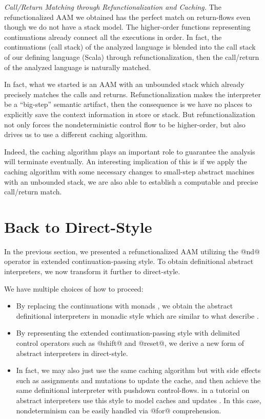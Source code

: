 \documentclass[acmsmall, review]{acmart}\settopmatter{}
\begin{document}
\textit{Call/Return Matching through Refunctionalization and Caching.}
The refunctionalized AAM we obtained has the perfect match on return-flows even though
we do not have a stack model. The higher-order functions representing continuations
already connect all the executions in order. In fact, the continuations (call stack)
of the analyzed language is blended into the call stack of our defining language
(Scala) through refunctionalization, then the call/return of the analyzed language
is naturally matched.

In fact, what we started is an AAM with an unbounded stack which already precisely
matches the calls and returns. Refunctionalization makes the interpreter be a ``big-step''
semantic artifact, then the consequence is we have no places to explicitly save the context
information in store or stack. 
But refunctionalization not only forces the nondeterministic control flow to be higher-order,
but also drives us to use a different caching algorithm.

Indeed, the caching algorithm plays an important role to guarantee the analysis will
terminate eventually.
An interesting implication of this is if we apply the caching algorithm with some 
necessary changes to small-step abstract machines with an unbounded stack, we are 
also able to establish a computable and precise call/return match.

\section{Back to Direct-Style} \label{directstyle}

In the previous section, we presented a refunctionalized AAM utilizing the @nd@ operator
in extended continuation-passing style.
To obtain definitional abstract interpreters, we now transform it further to direct-style.

We have multiple choices of how to proceed:
\begin{itemize}
  \item By replacing the continuations with monads \cite{filinski1994representing}, 
    we obtain the abstract definitional interpreters in monadic style which are similar to what 
    \citeauthor{darais2017abstracting} describe \cite{darais2017abstracting}.
  \item By representing the extended continuation-passing style with delimited control operators
    such as @shift@ and @reset@, we derive a new form of abstract interpreters in direct-style.
  \item In fact, we may also just use the same caching algorithm but with side effects such as
    assignments and mutations to update the cache, and then achieve the same definitional 
    interpreter with pushdown control-flows. \citeauthor{friedman-ai} in a tutorial on abstract 
    interpreters use this style to model caches and updates \cite{friedman-ai}.
    In this case, nondeterminism can be easily handled via @for@ comprehension. 
\end{itemize}
\end{document}
